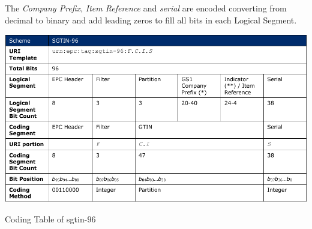 The \emph{Company Prefix}, \emph{Item Reference} and \emph{serial} are encoded converting from decimal to binary and add leading zeros to fill all bits in each Logical Segment.

\begin{table}[]
    \centering
    \includegraphics[width=\textwidth]{./figs/02-state-of-the-art/table_codingtable.pdf}
    \caption{Coding Table of \ac{sgtin}-$96$~\cite{GS1EPCTDS}} 
    \label{tab:sgtin96codingtable}
\end{table}

